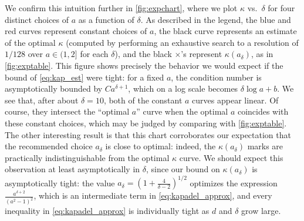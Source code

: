 We confirm this intuition further in \cref{fig:expchart}, where we plot $\kappa$ vs.~$\delta$ for four distinct choices of $a$ as a function of $\delta$.  As described in the legend, the blue and red curves represent constant choices of $a$, the black curve represents an estimate of the optimal $\kappa$ (computed by performing an exhaustive search to a resolution of $1 / 128$ over $a \in (1, 2]$ for each $\delta$), and the black $\times$'s represent $\kappa(a_\delta)$, as in \cref{fig:exptable}.  This figure shows precisely the behavior we would expect if the bound of \eqref{eq:kap_est} were tight: for a fixed $a$, the condition number is asymptotically bounded by $C a^{\delta + 1}$,  which on a log scale becomes $\delta \log a + b$.  We see that, after about $\delta = 10$, both of the constant $a$ curves appear linear.  Of course, they intersect the ``optimal $a$'' curve when the optimal $a$ coincides with these constant choices, which may be judged by comparing with \cref{fig:exptable}.  The other interesting result is that this chart corroborates our expectation that the recommended choice $a_\delta$ is close to optimal: indeed, the $\kappa(a_\delta)$ marks are practically indistinguishable from the optimal $\kappa$ curve. %
  We should expect this observation at least asymptotically in $\delta$, since our bound on $\kappa(a_\delta)$ is asymptotically tight: the value $a_\delta = (1 + \frac{4}{\delta - 2})^{1 / 2}$ optimizes the expression $\frac{a^{\delta + 2}}{(a^2 - 1)^2}$, which is an intermediate term in \eqref{eq:kapadel_approx}, and every inequality in \eqref{eq:kapadel_approx} is individually tight as $d$ and $\delta$ grow large.
